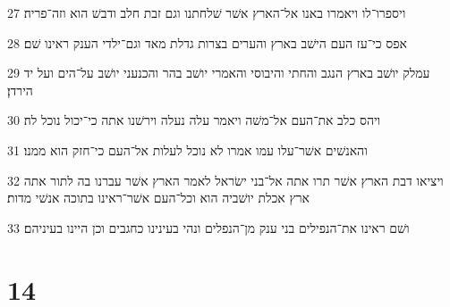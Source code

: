 \par 27 ויספרו־לו ויאמרו באנו אל־הארץ אשׁר שׁלחתנו וגם זבת חלב ודבשׁ הוא וזה־פריה׃
\par 28 אפס כי־עז העם הישׁב בארץ והערים בצרות גדלת מאד וגם־ילדי הענק ראינו שׁם׃
\par 29 עמלק יושׁב בארץ הנגב והחתי והיבוסי והאמרי יושׁב בהר והכנעני יושׁב על־הים ועל יד הירדן׃
\par 30 ויהס כלב את־העם אל־משׁה ויאמר עלה נעלה וירשׁנו אתה כי־יכול נוכל לה׃
\par 31 והאנשׁים אשׁר־עלו עמו אמרו לא נוכל לעלות אל־העם כי־חזק הוא ממנו׃
\par 32 ויציאו דבת הארץ אשׁר תרו אתה אל־בני ישׂראל לאמר הארץ אשׁר עברנו בה לתור אתה ארץ אכלת יושׁביה הוא וכל־העם אשׁר־ראינו בתוכה אנשׁי מדות׃
\par 33 ושׁם ראינו את־הנפילים בני ענק מן־הנפלים ונהי בעינינו כחגבים וכן היינו בעיניהם׃

\chapter{14}

